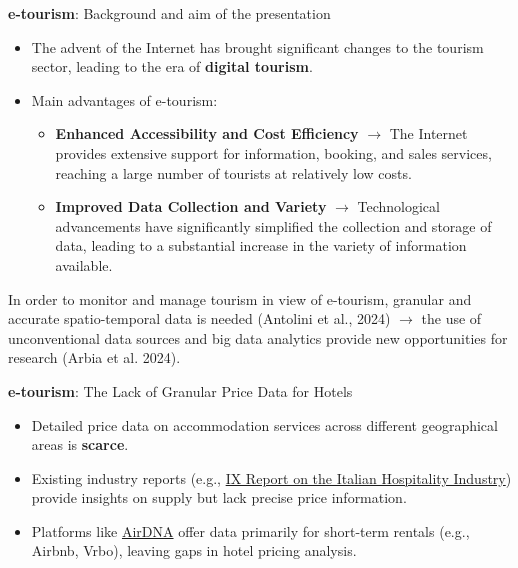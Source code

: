 \documentclass{beamer}
\begin{document}
\begin{frame}{\textbf{e-tourism}: Background and aim of the presentation}
\begin{itemize}
    \item The advent of the Internet has brought significant changes to the tourism sector, leading to the era of \textbf{digital tourism}. 
    \vspace{0.5cm}
    \item Main advantages of e-tourism: 

    \begin{itemize}
        \item [\ding{51}]  {\scriptsize \textbf{Enhanced Accessibility and Cost Efficiency} $\rightarrow$ The Internet provides extensive support for information, booking, and sales services, reaching a large number of tourists at relatively low costs.}
        \item [\ding{51}] {  \scriptsize \textbf{Improved Data Collection and Variety} $\rightarrow$ Technological advancements have significantly simplified the collection and storage of data, leading to a substantial increase in the variety of information available. }
    \end{itemize}
    \end{itemize}
    \vspace{0.3cm}
In order to monitor and manage tourism in view of e-tourism, granular and accurate spatio-temporal data is needed (Antolini et al., 2024)  $\rightarrow$ the use of unconventional data sources and big data analytics provide new opportunities for research (Arbia et al. 2024).  

\end{frame}

\begin{frame}{\textbf{e-tourism}: The Lack of Granular Price Data for Hotels}
\begin{itemize}
    \item Detailed price data on accommodation services across different geographical areas is \textbf{scarce}.
    \item Existing industry reports (e.g., \href{https://www.contenuti.icribis.com/osservatorio/2023/settore-alberghiero}{IX Report on the Italian Hospitality Industry}) provide insights on supply but lack precise price information.
    \item Platforms like \href{https://www.airdna.co/vacation-rental-data/app/it}{AirDNA} offer data primarily for short-term rentals (e.g., Airbnb, Vrbo), leaving gaps in hotel pricing analysis.
\end{itemize}
\end{frame}
\end{document}
